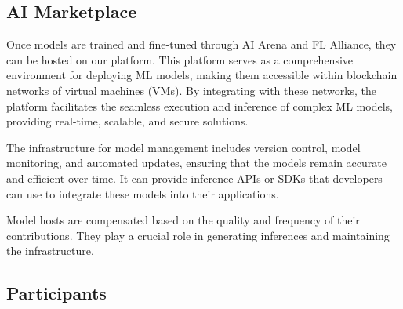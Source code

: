 \documentclass[conference]{IEEEtran}
\begin{document}
\subsection{AI Marketplace}




Once models are trained and fine-tuned through AI Arena and FL Alliance, they can be hosted on our platform. This platform serves as a comprehensive environment for deploying ML models, making them accessible within blockchain networks of virtual machines (VMs). By integrating with these networks, the platform facilitates the seamless execution and inference of complex ML models, providing real-time, scalable, and secure solutions.

The infrastructure for model management includes version control, model monitoring, and automated updates, ensuring that the models remain accurate and efficient over time. It can provide inference APIs or SDKs that developers can use to integrate these models into their applications.

Model hosts are compensated based on the quality and frequency of their contributions. They play a crucial role in generating inferences and maintaining the infrastructure.


\subsection{Participants}
\end{document}

